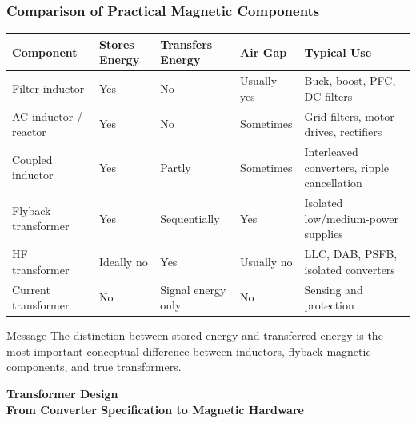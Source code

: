\begin{frame}
    \frametitle{Comparison of Practical Magnetic Components}

    \scriptsize
    \begin{table}
        \centering
        \begin{tabular}{p{}p{}p{}p{}p{}}
            \hline
            \textbf{Component} & \textbf{Stores Energy} & \textbf{Transfers Energy} & \textbf{Air Gap} & \textbf{Typical Use}\\
            \hline
            Filter inductor & Yes & No & Usually yes & Buck, boost, PFC, DC filters\\
            AC inductor / reactor & Yes & No & Sometimes & Grid filters, motor drives, rectifiers\\
            Coupled inductor & Yes & Partly & Sometimes & Interleaved converters, ripple cancellation\\
            Flyback transformer & Yes & Sequentially & Yes & Isolated low/medium-power supplies\\
            HF transformer & Ideally no & Yes & Usually no & LLC, DAB, PSFB, isolated converters\\
            Current transformer & No & Signal energy only & No & Sensing and protection\\
            \hline
        \end{tabular}
    \end{table}
    \begin{block}{Message}
        \small
        The distinction between stored energy and transferred energy is the most important conceptual difference between inductors, flyback magnetic components, and true transformers.
    \end{block}
\end{frame}

\begin{frame}
\begin{center}
  \textbf{\Huge{Transformer Design}}\\[0.4cm]
  \textbf{\Large{From Converter Specification to Magnetic Hardware}}
\end{center}
\end{frame}


